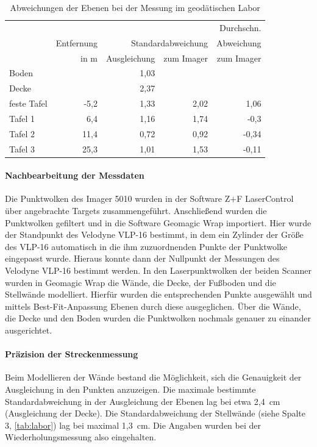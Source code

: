 \documentclass[a4paper,12pt,bibliography=totoc, listof=totoc,titlepage,pointlessnumbers]{scrreprt}
\begin{document}
\begin{table}[!ht]
\centering
\begin{tabular}{|l|r|r|r|r|}
\cline{2-4}
\hline
		& 		& \multicolumn{2}{r|}{} 	&  Durchschn.\\
		& Entfernung	& \multicolumn{2}{r|}{Standardabweichung} & Abweichung\\
		& in m		& Ausgleichung	& zum Imager 	& zum Imager \\ \hline
Boden		&		& 1,03		&		& 	\\ \hline
Decke		& 	    	& 2,37		&		& 	\\ \hline
feste Tafel	& -5,2		& 1,33		& 2,02		& 1,06	\\ \hline
Tafel 1		& 6,4      	& 1,16		& 1,74		& -0,3	\\ \hline
Tafel 2		& 11,4     	& 0,72		& 0,92		& -0,34	\\ \hline
Tafel 3		& 25,3     	& 1,01		& 1,53		& -0,11	\\ \hline
\end{tabular}
\caption{Abweichungen der Ebenen bei der Messung im geodätischen Labor}
\label{tab:labor}
\end{table}

\paragraph{Nachbearbeitung der Messdaten}
Die Punktwolken des Imager 5010 wurden in der Software Z+F LaserControl über angebrachte Targets zusammengeführt. Anschließend wurden die Punktwolken gefiltert und in die Software Geomagic Wrap importiert. Hier wurde der Standpunkt des Velodyne VLP-16 bestimmt, in dem ein Zylinder der Größe des VLP-16 automatisch in die ihm zuzuordnenden Punkte der Punktwolke eingepasst wurde.  Hieraus konnte dann der Nullpunkt der Messungen des Velodyne VLP-16 bestimmt werden.
In den Laserpunktwolken der beiden Scanner wurden in Geomagic Wrap die Wände, die Decke, der Fußboden und die Stellwände modelliert. Hierfür wurden die entsprechenden Punkte ausgewählt und mittels Best-Fit-Anpassung Ebenen durch diese ausgeglichen. Über die Wände, die Decke und den Boden wurden die Punktwolken nochmals genauer zu einander ausgerichtet.

\paragraph{Präzision der Streckenmessung}
Beim Modellieren der Wände bestand die Möglichkeit, sich die Genauigkeit der Ausgleichung in den Punkten anzuzeigen. Die maximale bestimmte Standardabweichung in der Ausgleichung der Ebenen lag bei etwa 2,4~cm (Ausgleichung der Decke). Die Standardabweichung der Stellwände (siehe Spalte 3, \autoref{tab:labor}) lag bei maximal 1,3~cm. Die Angaben wurden bei der Wiederholungsmessung also eingehalten.
\end{document}

